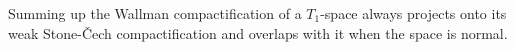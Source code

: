 \documentclass{article}
\theoremstyle{plain}
\newtheorem{proposition}[theorem]{Proposition}
\theoremstyle{definition}
\newtheorem{definition}[theorem]{Definition}
\theoremstyle{remark}
\newcommand{\0}{\mathbbm 0}
\newcommand{\1}{\mathbbm 1}
\newcommand{\2}{\mathbbm 2}
\begin{document}
Summing up the Wallman compactification of a $T_1$-space always projects onto its weak Stone-\v{C}ech compactification and overlaps with it when the space is normal.

%
%
%
%
%
%
%
\end{document}
